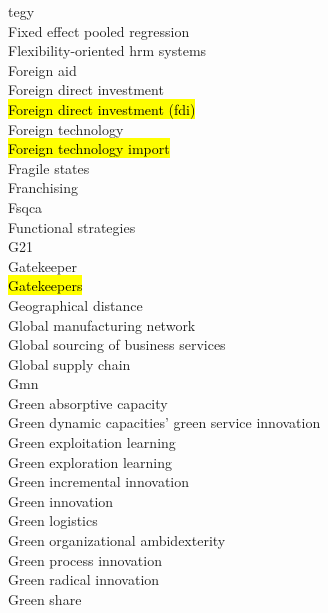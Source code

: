\documentclass[a4paper]{article}
\begin{document}
\begin{multicols*}{2}
\begin{footnotesize}
tegy \\ Fixed effect pooled regression \\ Flexibility-oriented hrm systems \\ Foreign aid \\ Foreign direct investment \\ \hl{Foreign direct investment (fdi)} \\ Foreign technology \\ \hl{Foreign technology import} \\ Fragile states \\ Franchising \\ Fsqca \\ Functional strategies \\ G21 \\ Gatekeeper \\ \hl{Gatekeepers} \\ Geographical distance \\ Global manufacturing network \\ Global sourcing of business services \\ Global supply chain \\ Gmn \\ Green absorptive capacity \\ Green dynamic capacities' green service innovation \\ Green exploitation learning \\ Green exploration learning \\ Green incremental innovation \\ Green innovation \\ Green logistics \\ Green organizational ambidexterity \\ Green process innovation \\ Green radical innovation \\ Green share
\end{footnotesize}
\end{multicols*}
\end{document}
